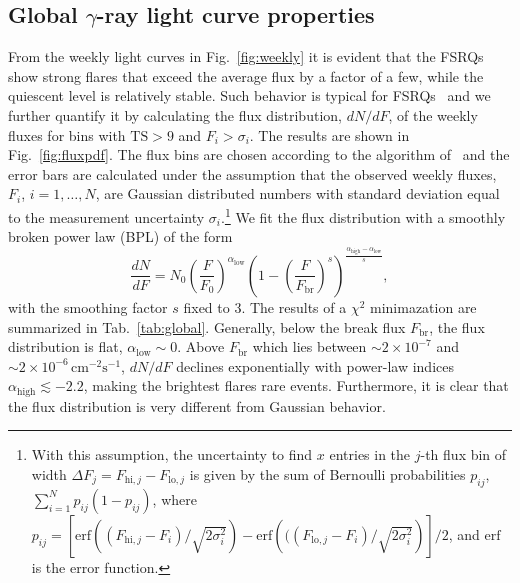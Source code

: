 \documentclass[twocolumn]{aastex62}
\newcommand{\gray}{$\gamma$-ray\xspace}
\begin{document}
\subsection{Global \gray light curve properties}
From the weekly light curves in Fig.~\ref{fig:weekly} it is evident that the FSRQs show strong flares that exceed the average flux by a factor of a few, while the quiescent level is relatively stable. 
Such behavior is typical for FSRQs~\citet{} and we 
further quantify it by calculating the flux distribution, $dN/dF$, of the weekly fluxes for bins with $\mathrm{TS} > 9$ and $F_i > \sigma_i$. 
The results are shown in Fig.~\ref{fig:fluxpdf}. The flux bins are chosen according to the algorithm of~\citet{knuth2006} and the error bars are calculated under the assumption that the observed weekly fluxes, $F_i$, $i = 1,\ldots,N$, are Gaussian distributed numbers with standard deviation equal to the measurement uncertainty $\sigma_i$.\footnote{
With this assumption, the uncertainty to find $x$ entries in the $j$-th flux bin of width $\Delta F_j = F_{\mathrm{hi},j} - F_{\mathrm{lo},j}$ is given by the sum of Bernoulli probabilities $p_{ij}$, $\sum_{i = 1}^N p_{ij}(1-p_{ij})$, where $p_{ij} =  \left[\mathrm{erf}\left((F_{\mathrm{hi},j} - F_i) / \sqrt{2\sigma_i^2}\right) - \mathrm{erf}\left(((F_{\mathrm{lo},j} - F_i) / \sqrt{2\sigma_i^2}\right)\right]/2$, and $\mathrm{erf}$ is the error function.
}
We fit the flux distribution with a smoothly broken power law (BPL) of the form 
\begin{equation}
    \frac{dN}{dF} = N_0 \left( \frac{F}{F_0}\right)^{\alpha_\mathrm{low}}
        \left( 1 - \left(\frac{F}{F_\mathrm{br}}\right)^s \right)^{\frac{\alpha_\mathrm{high} - \alpha_\mathrm{low}}{s}},
        \label{eq:dndf}
\end{equation}
with the smoothing factor $s$ fixed to 3. 
The results of a $\chi^2$ minimazation are summarized in Tab.~\ref{tab:global}.
Generally, below the break flux $F_\mathrm{br}$, the flux distribution is flat, $\alpha_\mathrm{low}\sim 0$.
Above $F_\mathrm{br}$ which lies between $\sim2\times10^{-7}$ and $\sim2\times10^{-6}\,\mathrm{cm}^{-2}\mathrm{s}^{-1}$, $dN/dF$ declines exponentially with power-law indices $\alpha_\mathrm{high} \lesssim -2.2$, making the brightest flares rare events.
Furthermore, it is clear that the flux distribution is very different from Gaussian behavior. 
\end{document}
